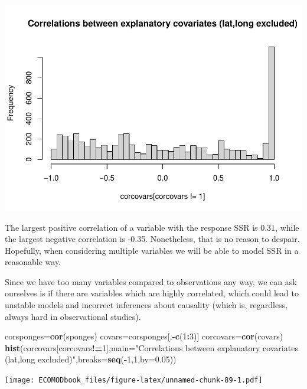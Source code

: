 \documentclass[
]{book}
\newenvironment{Shaded}{\begin{snugshade}}{\end{snugshade}}
\newcommand{\AttributeTok}[1]{\textcolor[rgb]{0.13,0.29,0.53}{#1}}
\newcommand{\DecValTok}[1]{\textcolor[rgb]{0.00,0.00,0.81}{#1}}
\newcommand{\FloatTok}[1]{\textcolor[rgb]{0.00,0.00,0.81}{#1}}
\newcommand{\FunctionTok}[1]{\textcolor[rgb]{0.13,0.29,0.53}{\textbf{#1}}}
\newcommand{\NormalTok}[1]{#1}
\newcommand{\OtherTok}[1]{\textcolor[rgb]{0.56,0.35,0.01}{#1}}
\newcommand{\SpecialCharTok}[1]{\textcolor[rgb]{0.81,0.36,0.00}{\textbf{#1}}}
\newcommand{\StringTok}[1]{\textcolor[rgb]{0.31,0.60,0.02}{#1}}
\begin{document}
\includegraphics{ECOMODbook_files/figure-latex/unnamed-chunk-88-1.pdf}

The largest positive correlation of a variable with the response SSR is 0.31, while the largest negative correlation is -0.35. Nonetheless, that is no reason to despair. Hopefully, when considering multiple variables we will be able to model SSR in a reasonable way.

Since we have too many variables compared to observations any way, we can ask ourselves is if there are variables which are highly correlated, which could lead to unstable models and incorrect inferences about causality (which is, regardless, always hard in observational studies).

\begin{Shaded}
\begin{Highlighting}[]
\NormalTok{corsponges}\OtherTok{=}\FunctionTok{cor}\NormalTok{(sponges)}
\NormalTok{covars}\OtherTok{=}\NormalTok{corsponges[,}\SpecialCharTok{{-}}\FunctionTok{c}\NormalTok{(}\DecValTok{1}\SpecialCharTok{:}\DecValTok{3}\NormalTok{)]}
\NormalTok{corcovars}\OtherTok{=}\FunctionTok{cor}\NormalTok{(covars)}
\FunctionTok{hist}\NormalTok{(corcovars[corcovars}\SpecialCharTok{!=}\DecValTok{1}\NormalTok{],}\AttributeTok{main=}\StringTok{"Correlations between explanatory covariates (lat,long excluded)"}\NormalTok{,}\AttributeTok{breaks=}\FunctionTok{seq}\NormalTok{(}\SpecialCharTok{{-}}\DecValTok{1}\NormalTok{,}\DecValTok{1}\NormalTok{,}\AttributeTok{by=}\FloatTok{0.05}\NormalTok{))}
\end{Highlighting}
\end{Shaded}

\texttt{[image: ECOMODbook\_files/figure-latex/unnamed-chunk-89-1.pdf]}
\end{document}
